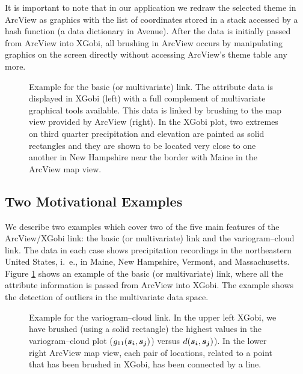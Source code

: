 It is important to note that in our application we redraw the
selected theme in ArcView as graphics 
with the list of coordinates stored in a
stack accessed by a hash function (a data dictionary in Avenue). 
After the data is initially passed from ArcView into XGobi,
all brushing in ArcView occurs by manipulating graphics on the screen 
directly without accessing ArcView's theme table any more.


\begin{figure}[b] 
\centerline{\epsfxsize=6in} 
\caption{Example for the basic (or multivariate) link. The attribute
data is displayed in XGobi (left) with a full complement of
multivariate graphical tools available. This data is linked by
brushing to the map view provided by ArcView (right). In the XGobi plot, two
extremes on third quarter precipitation and elevation are painted as
solid rectangles and they are shown to be located very close
to one another in New Hampshire near the border with Maine
in the ArcView map view.}
\label{ex_mult.ps}
\end{figure}


\subsection{Two Motivational Examples}

We describe two examples which cover two of the five main features
of the ArcView/XGobi link: the basic (or multivariate) link
and the variogram--cloud link. The data in each case shows
precipitation recordings in the northeastern United States, i.~e., in
Maine, New Hampshire, Vermont, and Massachusetts. Figure
\ref{ex_mult.ps} shows an example of the basic (or multivariate) link,
where all the attribute information is passed from ArcView
into XGobi. The example
shows the detection of outliers in the multivariate data space. 

\begin{figure}[b]
\centerline{\epsfxsize=5in}
\caption{Example for the variogram--cloud link.
In the upper left XGobi, we have brushed
(using a solid rectangle) the highest values in the 
variogram--cloud plot ($g_{11} (\mbox{\boldmath$s_i$}, 
\mbox{\boldmath$s_j$})$) versus
$d (\mbox{\boldmath$s_i$}, \mbox{\boldmath$s_j$})$).
In the lower right ArcView map view, each pair
of locations, related to a point that has been brushed in XGobi,
has been connected by a line.}
\label{ex_vario.ps}
\end{figure}

